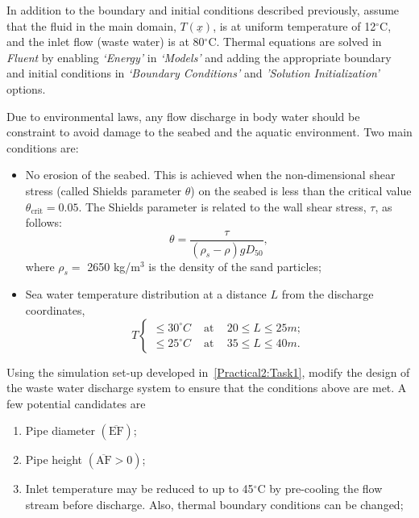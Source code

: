 \documentclass[12pts,a4paper,amsmath,amssymb,floatfix]{article}%
\renewcommand\leq{\leqslant}
\newcommand{\frc}{\displaystyle\frac}
\begin{document}
\begin{enumerate}[label=\bfseries Problem \arabic*:]
\begin{enumerate}[label=\bfseries Task 2.\arabic*]
In addition to the boundary and initial conditions described previously, assume that the fluid in the main domain, $T\left(\underline{x}\right)$, is at uniform temperature of 12$^{\circ}$C, and the inlet flow (waste water) is at 80$^{\circ}$C. Thermal equations are solved in {\it Fluent} by enabling {\it `Energy'} in {\it `Models'} and adding the appropriate boundary and initial conditions in {\it `Boundary Conditions'} and {\it 'Solution Initialization'} options.

Due to environmental laws, any flow discharge in body water should be constraint to avoid damage to the seabed and the aquatic environment. Two main conditions are:
   \begin{itemize}
        \item No erosion of the seabed. This is achieved when the non-dimensional shear stress (called Shields parameter $\theta$) on the seabed is less than the critical value $\theta_{\text{crit}}=0.05$.
         The Shields parameter is related to the wall shear stress, $\tau$, as follows:
            \begin{displaymath}
               \theta = \frc{\tau}{\left(\rho_{s}-\rho\right)g D_{50}},
            \end{displaymath}
             where $\rho_{s}=$ 2650 kg/m$^{3}$ is the density of the sand particles;
        \item Sea water temperature distribution at a distance $L$ from the discharge coordinates,
         \[ T \begin{cases}
             \leq 30^{\circ}C & \text{ at } \;\;\; 20 \leq L \leq 25 m; \\
             \leq 25^{\circ}C & \text{ at } \;\;\; 35 \leq L \leq 40 m.
         \end{cases}\]
   \end{itemize}

Using the simulation set-up developed in~\ref{Practical2:Task1}, modify the design of the waste water discharge system  to ensure that the conditions above are met. A few potential candidates are
   \begin{enumerate}
      \item Pipe diameter $\left(\overline{\text{EF}}\right)$;
      \item Pipe height $\left(\overline{\text{AF}} > 0\right)$;
      \item Inlet temperature may be reduced to up to 45$^{\circ}$C by pre-cooling the flow stream before discharge. Also, thermal boundary conditions can be changed;
   \end{enumerate}

\end{enumerate}

\end{enumerate}
\end{document}

